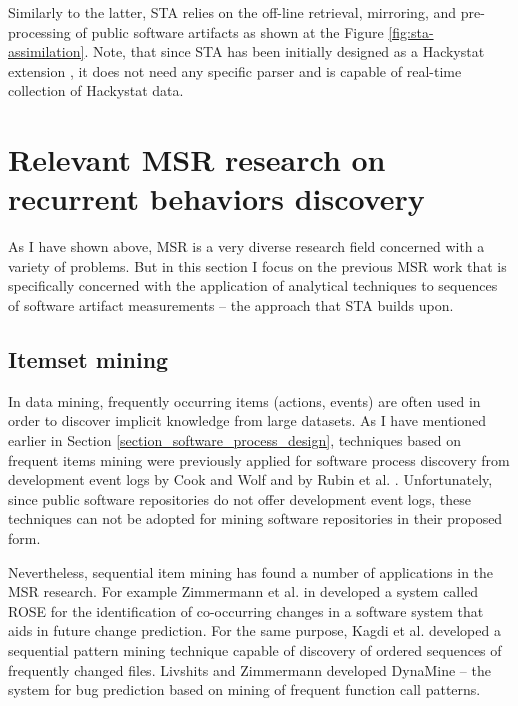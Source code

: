Similarly to the latter, STA relies on the off-line retrieval, mirroring, and pre-processing of public software artifacts as
shown at the Figure \ref{fig:sta-assimilation}. Note, that since STA has been initially designed as a Hackystat extension 
\cite{csdl2-10-09}, it does not need any specific parser and is capable of real-time collection of Hackystat data.

\section{Relevant MSR research on recurrent behaviors discovery}
As I have shown above, MSR is a very diverse research field concerned with a variety of problems. 
But in this section I focus on the previous MSR work that is specifically concerned with the application of analytical 
techniques to sequences of software artifact measurements -- the approach that STA builds upon.

\subsection{Itemset mining}
In data mining, frequently occurring items (actions, events) are often used in order to discover implicit knowledge from
large datasets. As I have mentioned earlier in Section \ref{section_software_process_design}, techniques based on frequent
items mining were previously applied for software process discovery from development event logs 
by Cook and Wolf \cite{citeulike:328044} \cite{citeulike:5120757} \cite{citeulike:5128143} 
and by Rubin et al. \cite{citeulike:1885717}. Unfortunately, since public software repositories do not offer 
development event logs, these techniques can not be adopted for mining software repositories in their proposed form.

Nevertheless, sequential item mining has found a number of applications in the MSR research.
For example Zimmermann et al. in \cite{citeulike:277045} developed a system called ROSE for the identification of 
co-occurring changes in a software system that aids in future change prediction. 
For the same purpose, Kagdi et al. \cite{citeulike:3929070} developed a sequential pattern mining technique capable of 
discovery of ordered sequences of frequently changed files. 
Livshits and Zimmermann \cite{citeulike:393158} developed DynaMine -- the system for bug prediction based on mining 
of frequent function call patterns.


